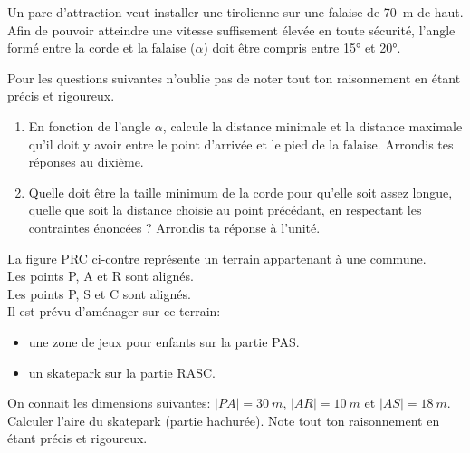 \documentclass[../partie2.tex]{subfiles}
\begin{document}
\begin{exercise}[points=3]
    Un parc d'attraction veut installer une tirolienne sur une falaise de \SI{70}{m} de haut.
    Afin de pouvoir atteindre une vitesse suffisement élevée en toute sécurité, l'angle formé entre la corde et la falaise ($\alpha$) doit être compris entre \ang{15} et \ang{20}.
    \begin{center}
        
    \end{center}
    Pour les questions suivantes n'oublie pas de  noter tout ton raisonnement en étant précis et rigoureux.
    \begin{enumerate}
        \item En fonction de l'angle $\alpha$, calcule la distance minimale et la distance maximale qu'il doit y avoir entre le point d'arrivée et le pied de la falaise. Arrondis tes réponses au dixième.
        \item Quelle doit être la taille minimum de la corde pour qu'elle soit assez longue, quelle que soit la distance choisie au point précédant, en respectant les contraintes énoncées ? Arrondis ta réponse à l'unité.
    \end{enumerate}
\end{exercise}
\begin{solution}

\end{solution}
\begin{exercise}[points=4]
    \begin{minipage}{.65\linewidth}
        La figure PRC ci-contre représente un terrain appartenant à une commune.\\
        Les points P, A et R sont alignés.\\
        Les points P, S et C sont alignés.\\
        Il est prévu d'aménager sur ce terrain:
        \begin{itemize}
            \item une zone de jeux pour enfants sur la partie PAS.
            \item un skatepark sur la partie RASC.
        \end{itemize}
    \end{minipage}
    \hfill
    \begin{minipage}{.3\linewidth}
        
    \end{minipage}

    On connait les dimensions suivantes: $|PA|=\SI{30}{m}$, $|AR|=\SI{10}{m}$ et $|AS|=\SI{18}{m}$.\\
    Calculer l'aire du skatepark (partie hachurée). Note tout ton raisonnement en étant précis et rigoureux.\\
\end{exercise}
\end{document}
